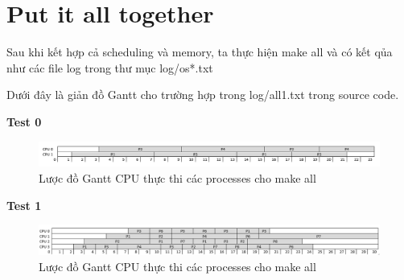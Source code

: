 \section{Put it all together}

Sau khi kết hợp cả scheduling và memory, ta thực hiện make all và có kết qủa như các file log trong thư mục log/os*.txt


Dưới đây là giản đồ Gantt cho trường hợp trong log/all1.txt trong source code.

\textbf{Test 0}



\begin{figure}[tph]
	\centering
	\includegraphics[width=15cm]{Images/Gantt1.png}
	\vspace{0.5cm}
	\caption{Lược đồ Gantt CPU thực thi các processes cho make all}
	\label{fig:all0}
\end{figure}

\textbf{Test 1}



\begin{figure}[tph]
	\centering
	\includegraphics[width=15cm]{Images/Gantt2.png}
	\vspace{0.5cm}
	\caption{Lược đồ Gantt CPU thực thi các processes cho make all}
	\label{fig:all1}
\end{figure}

\vspace{0.5cm}
